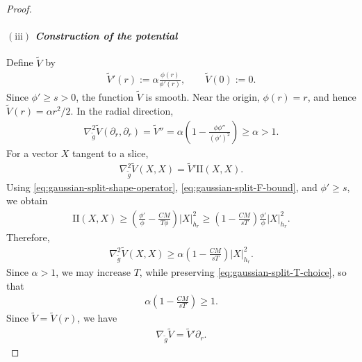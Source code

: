 \documentclass[11pt,reqno]{amsart}
\numberwithin{equation}{section}
\theoremstyle{definition}
\theoremstyle{remark}
\newcommand{\0}{\emptyset}
\begin{document}
\begin{proof}
\paragraph{$\mathrm{(iii)}$ \textit{Construction of the potential}} Define $\widetilde V$ by
\begin{align}\label{eq:gaussian-split-Vtilde-definition}
        \widetilde V'(r)
        :=
        \alpha\frac{\phi(r)}{\phi'(r)},
        \qquad
        \widetilde V(0):=0.
\end{align}
Since $\phi'\geq s>0$, the function $\widetilde V$ is smooth. Near the
origin, $\phi(r)=r$, and hence
$\widetilde V(r)=\alpha r^2/2$. In the radial direction,
\begin{align}\label{eq:gaussian-split-Vtilde-radial-Hessian}
        \nabla_{\widetilde g}^2\widetilde V(\partial_r,\partial_r)
        =
        \widetilde V''
        =
        \alpha
        \left(
        1-
        \frac{\phi\phi''}{(\phi')^2}
        \right)
        \geq
        \alpha
        >
        1.
\end{align}
For a vector $X$ tangent to a slice,
\begin{align}
        \nabla_{\widetilde g}^2\widetilde V(X,X)
        =
        \widetilde V'\mathrm{II}(X,X).
\end{align}
Using \eqref{eq:gaussian-split-shape-operator},
\eqref{eq:gaussian-split-F-bound}, and $\phi'\geq s$, we obtain
\begin{align}
        \mathrm{II}(X,X)
        \geq
        \left(
        \frac{\phi'}{\phi}
        -
        \frac{CM}{T\phi}
        \right)|X|_{h_r}^2
        \geq
        \left(
        1-
        \frac{CM}{sT}
        \right)
        \frac{\phi'}{\phi}|X|_{h_r}^2.
\end{align}
Therefore,
\begin{align}\label{eq:gaussian-split-Vtilde-tangential-Hessian}
        \nabla_{\widetilde g}^2\widetilde V(X,X)
        \geq
        \alpha
        \left(
        1-
        \frac{CM}{sT}
        \right)|X|_{h_r}^2.
\end{align}
Since $\alpha>1$, we may increase $T$, while preserving
\eqref{eq:gaussian-split-T-choice}, so that
\begin{align}
        \alpha
        \left(
        1-
        \frac{CM}{sT}
        \right)
        \geq
        1.
\end{align}
Since $\widetilde V=\widetilde V(r)$, we have
\begin{align}
        \nabla_{\widetilde g}\widetilde V
        =
        \widetilde V'\partial_r.

\end{align}
\end{proof}
\end{document}
